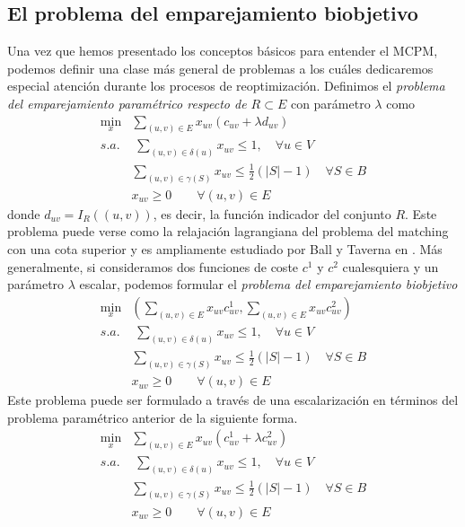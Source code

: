 \documentclass[twoside,a4paper,openright,12pt]{book}
\begin{document}
\subsection{El problema del emparejamiento biobjetivo}
Una vez que hemos presentado los conceptos básicos para entender el MCPM, podemos definir una clase más general de problemas a los cuáles dedicaremos especial atención durante los procesos de reoptimización. Definimos el \textit{problema del emparejamiento paramétrico respecto de $R\subset E$} con parámetro $\lambda$ como
\begin{align*}
\min_x & \sum_{(u,v) \in E}x_{uv} (c_{uv} + \lambda d_{uv})\\
s.a.&\;\sum_{(u,v)\in\delta(u)} x_{uv} \leq 1, \quad \forall u \in V\\
&\sum_{(u,v)\in \gamma(S)} x_{uv} \leq \frac{1}{2}(|S|-1)\quad \forall S \in B	\\
&x_{uv} \geq 0 \qquad \forall(u,v)\in E
\end{align*}
donde 
$
d_{uv} = I_R((u,v))$, es decir, la función indicador del conjunto $R$. Este problema puede verse como la relajación lagrangiana del problema del matching con una cota superior y es ampliamente estudiado por Ball y Taverna en \cite{balltab}. 
Más generalmente, si consideramos dos funciones de coste $c^1$ y $c^2$ cualesquiera y un parámetro $\lambda$ escalar, podemos formular el \textit{problema del emparejamiento biobjetivo}
\begin{align*}
\min_x & \left(\sum_{(u,v) \in E}x_{uv}c^1_{uv},\sum_{(u,v) \in E}x_{uv} c^2_{uv}\right)\\
s.a.&\;\sum_{(u,v)\in\delta(u)} x_{uv} \leq 1, \quad \forall u \in V\\
&\sum_{(u,v)\in \gamma(S)} x_{uv} \leq \frac{1}{2}(|S|-1)\quad \forall S \in B	\\
&x_{uv} \geq 0 \qquad \forall(u,v)\in E
\end{align*}
Este problema puede ser formulado a través de una escalarización en términos del problema paramétrico anterior de la siguiente forma.
\begin{align*}
\min_x & \sum_{(u,v) \in E}x_{uv}(c^1_{uv}+\lambda c^2_{uv})\\
s.a.&\;\sum_{(u,v)\in\delta(u)} x_{uv} \leq 1, \quad \forall u \in V\\
&\sum_{(u,v)\in \gamma(S)} x_{uv} \leq \frac{1}{2}(|S|-1)\quad \forall S \in B	\\
&x_{uv} \geq 0 \qquad \forall(u,v)\in E
\end{align*}
\end{document}
